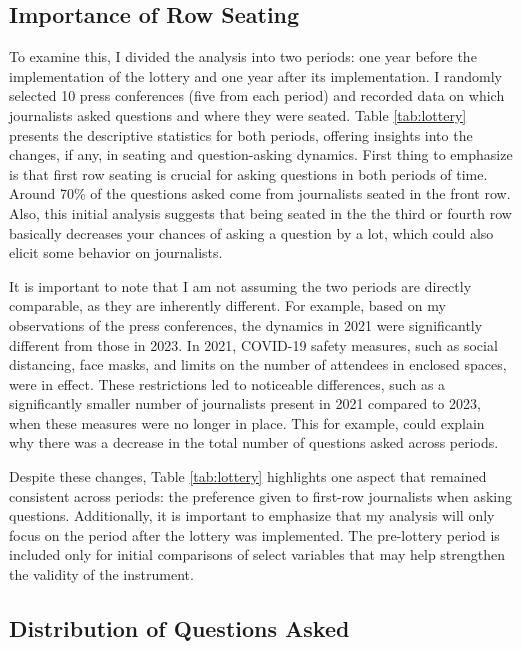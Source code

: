 \subsection{Importance of Row Seating}

To examine this, I divided the analysis into two periods: one year before the implementation of the lottery and one year after its implementation. I randomly selected 10 press conferences (five from each period) and recorded data on which journalists asked questions and where they were seated. Table \ref{tab:lottery} presents the descriptive statistics for both periods, offering insights into the changes, if any, in seating and question-asking dynamics. First thing to emphasize is that first row seating is crucial for asking questions in both periods of time. Around 70\% of the questions asked come from journalists seated in the front row. Also, this initial analysis suggests that being seated in the the third or fourth row basically decreases your chances of asking a question by a lot, which could also elicit some behavior on journalists.



It is important to note that I am not assuming the two periods are directly comparable, as they are inherently different. For example, based on my observations of the press conferences, the dynamics in 2021 were significantly different from those in 2023. In 2021, COVID-19 safety measures, such as social distancing, face masks, and limits on the number of attendees in enclosed spaces, were in effect. These restrictions led to noticeable differences, such as a significantly smaller number of journalists present in 2021 compared to 2023, when these measures were no longer in place. This for example, could explain why there was a decrease in the total number of questions asked across periods.

Despite these changes, Table \ref{tab:lottery} highlights one aspect that remained consistent across periods: the preference given to first-row journalists when asking questions. Additionally, it is important to emphasize that my analysis will only focus on the period after the lottery was implemented. The pre-lottery period is included only for initial comparisons of select variables that may help strengthen the validity of the instrument.

\subsection{Distribution of Questions Asked}

